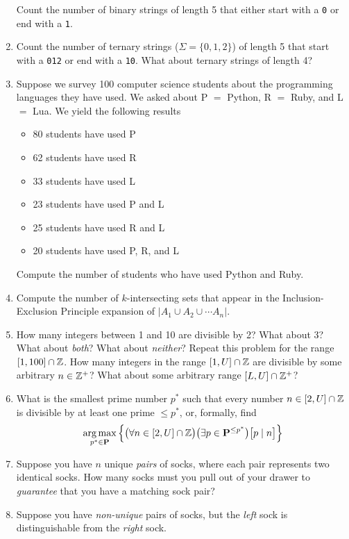 \documentclass[main.tex]{subfiles}
\begin{document}
\begin{enumerate}
	Count the number of binary strings of length 5 that either start with a \texttt{0} or end with a \texttt{1}.
	\item
	Count the number of ternary strings (\(\Sigma = \{0,1,2\}\)) of length 5 that start with a \texttt{012} or end with a \texttt{10}.
	What about ternary strings of length 4?
	\item
	Suppose we survey 100 computer science students about the programming languages they have used.
	We asked about P \(=\) Python, R \(=\) Ruby, and L \(=\) Lua.
	We yield the following results
	\begin{multicols}{2}
		\begin{itemize}
			\item
			80 students have used P
			\item
			62 students have used R
			\item
			33 students have used L
			\item
			23 students have used P and L
			\item
			25 students have used R and L
			\item
			20 students have used P, R, and L
		\end{itemize}
	\end{multicols}
	Compute the number of students who have used Python and Ruby.
	\item
	Compute the number of \(k\)-intersecting sets that appear in the Inclusion-Exclusion Principle expansion of \(|A_1 \cup A_2 \cup \cdots A_n|\).
	\item
	How many integers between 1 and 10 are divisible by 2? What about 3? What about \textit{both}? What about \textit{neither}?
	Repeat this problem for the range \([1,100] \cap \mathbb{Z}\).
	How many integers in the range \([1,U] \cap \mathbb{Z}\) are divisible by some arbitrary \(n \in \mathbb{Z}^+\)?
	What about some arbitrary range \([L,U] \cap \mathbb{Z}^+\)?
	\item
	What is the smallest prime number \(p^*\) such that every number \(n \in [2,U] \cap \mathbb{Z}\) is divisible by at least one prime \(\leq p^*\), or, formally, find
	\[\underset{p^* \in \mathbf{P}}{\arg\max} \left\{ \big(\forall n \in [2,U] \cap \mathbb{Z}\big) \big(\exists p \in \mathbf{P}^{\leq p^*}\big) \big[p \mid n\big] \right\}\]
	\item
	Suppose you have \(n\) unique \textit{pairs} of socks, where each pair represents two identical socks.
	How many socks must you pull out of your drawer to \textit{guarantee} that you have a matching sock pair?
	\item
	Suppose you have \textit{non-unique} pairs of socks, but the \textit{left} sock is distinguishable from the \textit{right} sock.

\end{enumerate}
\end{document}
